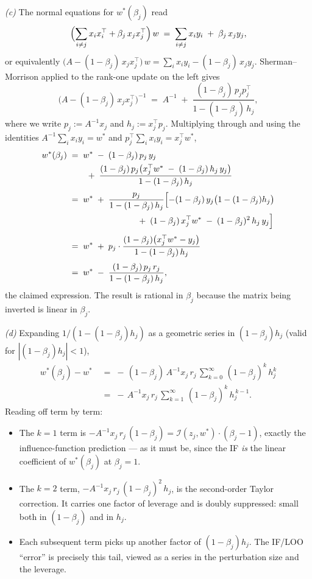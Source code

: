 \begin{solution}[ex:ols-if]
\textit{(c)} The normal equations for $w^*(\beta_j)$ read
\[
  \Bigl(\sum_{i\ne j} x_i x_i^\top + \beta_j\,x_j x_j^\top\Bigr)\,w \;=\; \sum_{i\ne j} x_i y_i \;+\; \beta_j\,x_j y_j,
\]
or equivalently $\bigl(A - (1-\beta_j)\,x_j x_j^\top\bigr)\,w = \sum_i x_i y_i - (1-\beta_j)\,x_j y_j$. Sherman--Morrison applied to the rank-one update on the left gives
\[
  \bigl(A - (1-\beta_j)\,x_j x_j^\top\bigr)^{-1} \;=\; A^{-1} \;+\; \frac{(1-\beta_j)\,p_j p_j^\top}{1 - (1-\beta_j)\,h_j},
\]
where we write $p_j := A^{-1} x_j$ and $h_j := x_j^\top p_j$. Multiplying through and using the identities $A^{-1}\sum_i x_i y_i = w^*$ and $p_j^\top\sum_i x_i y_i = x_j^\top w^*$,
\begin{align*}
  w^*(\beta_j)
  &\;=\; w^* \;-\; (1-\beta_j)\,p_j\,y_j \\
  &\qquad\;+\; \frac{(1-\beta_j)\,p_j\bigl(x_j^\top w^* \;-\; (1-\beta_j)\,h_j\,y_j\bigr)}{1 - (1-\beta_j)\,h_j} \\[3pt]
  &\;=\; w^* \;+\; \frac{p_j}{1 - (1-\beta_j)\,h_j}\Bigl[-(1-\beta_j)\,y_j\bigl(1-(1-\beta_j)h_j\bigr) \\
  &\qquad\qquad\qquad\qquad\;+\; (1-\beta_j)\,x_j^\top w^* \;-\; (1-\beta_j)^2\,h_j\,y_j\Bigr] \\[3pt]
  &\;=\; w^* \;+\; p_j\cdot\frac{(1-\beta_j)\bigl(x_j^\top w^* - y_j\bigr)}{1 - (1-\beta_j)\,h_j} \\[3pt]
  &\;=\; w^* \;-\; \frac{(1-\beta_j)\,p_j\,r_j}{1 - (1-\beta_j)\,h_j},
\end{align*}
the claimed expression. The result is rational in $\beta_j$ because the matrix being inverted is linear in $\beta_j$.

\textit{(d)} Expanding $1/(1-(1-\beta_j) h_j)$ as a geometric series in $(1-\beta_j) h_j$ (valid for $|(1-\beta_j) h_j| < 1$),
\begin{align*}
  w^*(\beta_j) - w^* &\;=\; -\,(1-\beta_j)\,A^{-1} x_j\,r_j\,\sum_{k=0}^{\infty}\,(1-\beta_j)^{k}\,h_j^{k} \\
  &\;=\; -\,A^{-1} x_j\,r_j\,\sum_{k=1}^{\infty}\,(1-\beta_j)^{k}\,h_j^{\,k-1}.
\end{align*}
Reading off term by term:
\begin{itemize}
  \item The $k=1$ term is $-A^{-1} x_j\,r_j\,(1-\beta_j) = \mathcal{I}(z_j,w^*)\cdot(\beta_j - 1)$, exactly the influence-function prediction --- as it must be, since the IF \emph{is} the linear coefficient of $w^*(\beta_j)$ at $\beta_j = 1$.
  \item The $k=2$ term, $-A^{-1} x_j\,r_j\,(1-\beta_j)^2\,h_j$, is the second-order Taylor correction. It carries one factor of leverage and is doubly suppressed: small both in $(1-\beta_j)$ and in $h_j$.
  \item Each subsequent term picks up another factor of $(1-\beta_j) h_j$. The IF/LOO ``error'' is precisely this tail, viewed as a series in the perturbation size and the leverage.
\end{itemize}


\end{solution}
